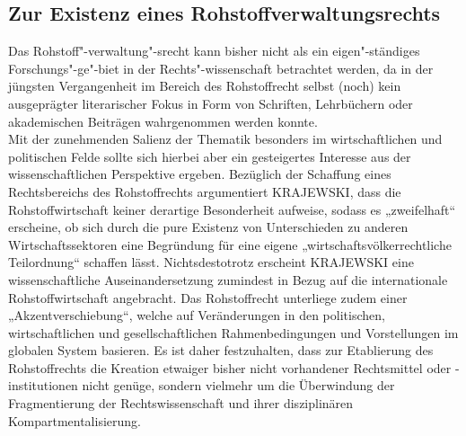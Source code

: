 \documentclass[12pt,a4paper,oneside]{book} %
\begin{document}
\subsection{Zur Existenz eines Rohstoffverwaltungsrechts}
Das Rohstoff"-verwaltung"-srecht kann bisher nicht als ein eigen"-ständiges Forschungs"-ge"-biet in der Rechts"-wissenschaft betrachtet werden, da in der jüngsten Vergangenheit im Bereich des Rohstoffrecht selbst (noch) kein ausgeprägter literarischer Fokus in Form von Schriften, Lehrbüchern oder akademischen Beiträgen wahrgenommen werden konnte.\autocites{feichtner_besonderheit_2016}{schladebach_zur_2017}
\autocite{terhechte_konsolidierung_2015}
\autocite{terhechte_falle_2012}
\\
Mit der zunehmenden Salienz der Thematik besonders im wirtschaftlichen und politischen Felde sollte sich hierbei aber ein gesteigertes Interesse aus der wissenschaftlichen Perspektive ergeben.
Bezüglich der Schaffung eines Rechtsbereichs des Rohstoffrechts argumentiert KRAJEWSKI, dass die Rohstoffwirtschaft keiner derartige Besonderheit aufweise, sodass es „zweifelhaft“ erscheine, ob sich durch die pure Existenz von Unterschieden zu anderen Wirtschaftssektoren eine Begründung für eine eigene „wirtschaftsvölkerrechtliche Teilordnung“ schaffen lässt.\autocite{krajewski_menschenrechte_2016} Nichtsdestotrotz erscheint KRAJEWSKI eine wissenschaftliche Auseinandersetzung zumindest in Bezug auf die internationale Rohstoffwirtschaft angebracht.\autocite{krajewski_menschenrechte_2016} Das Rohstoffrecht unterliege zudem einer „Akzentverschiebung“, welche auf Veränderungen in den politischen, wirtschaftlichen und gesellschaftlichen Rahmenbedingungen und Vorstellungen im globalen System basieren.\autocite{nowrot_menschenrechtliche_2022} Es ist daher festzuhalten, dass zur Etablierung des Rohstoffrechts die Kreation etwaiger bisher nicht vorhandener Rechtsmittel oder -institutionen nicht genüge, sondern vielmehr um die \glqq Überwindung der Fragmentierung der Rechtswissenschaft und ihrer disziplinären Kompartmentalisierung\grqq .\autocite{feichtner_besonderheit_2016}
\end{document}
